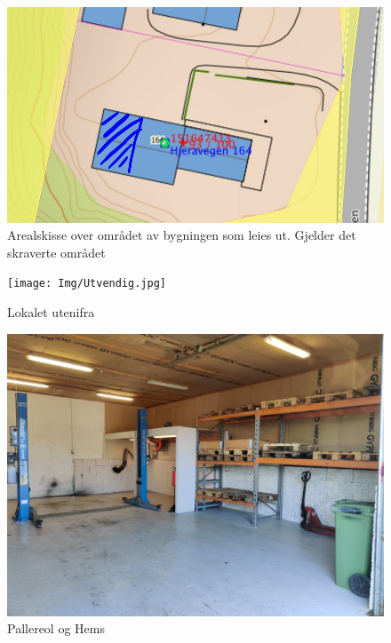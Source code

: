 

    \newpage


        \begin{figure}[H]
            \centering
            \includegraphics[width=1\textwidth]{Img/Arealskisse.JPG}
            \caption{Arealskisse over området av bygningen som leies ut. Gjelder det skraverte området}
            \label{fig:Arealskisse}
        \end{figure}


        \begin{figure}[H]
            \centering
            \texttt{[image: Img/Utvendig.jpg]}
            \caption{Lokalet utenifra}
            \label{fig:Lokalet_utenifra}
        \end{figure}


        \begin{figure}[H]
            \centering
            \includegraphics[width=1\textwidth]{Img/Pallereol_Og_Hems.JPG}
            \caption{Pallereol og Hems}
            \label{fig:P_og_H}
        \end{figure}


